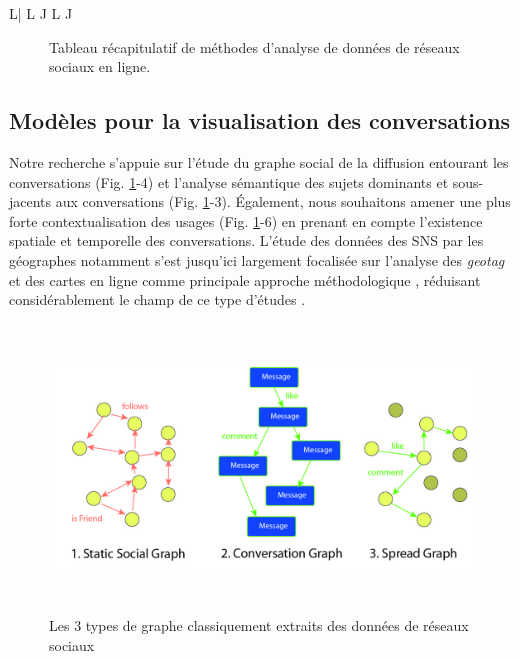 \begin{landscape}
{\begin{spacing}{1}
\begin{ltabulary}{L| L J L J}
    \end{ltabulary}
    \end{spacing} %
    \begin{figure}
        \caption[Tableau récapitulatif de méthodes d{\textquoteright}analyse de données de réseaux sociaux en ligne.]{Tableau récapitulatif de méthodes d{\textquoteright}analyse de données de réseaux sociaux en ligne.}
        \label{tab:sna}
    \end{figure}
}
\end{landscape}

\subsection[Modèles pour la visualisation des conversations]{Modèles pour la visualisation des conversations}

Notre recherche s'appuie sur l{\textquoteright}étude du graphe social de la diffusion entourant les conversations (Fig. \ref{tab:sna}-4) et l{\textquoteright}analyse sémantique des sujets dominants et sous-jacents aux conversations (Fig. \ref{tab:sna}-3). \'Egalement, nous souhaitons amener une plus forte contextualisation des usages (Fig. \ref{tab:sna}-6) en prenant en compte l{\textquoteright}existence spatiale et temporelle des conversations. L'étude des données des SNS par les géographes notamment s{\textquoteright}est jusqu{\textquoteright}ici largement focalisée sur l{\textquoteright}analyse des \textit{geotag} et des cartes en ligne comme principale approche méthodologique \citep{Graham2011, Poorthuis2013}, réduisant considérablement le champ de ce type d'études \citep{Crampton2013}.

\begin{figure}[htbp]
    \centering
    \includegraphics[width=6.2894in,height=3.0004in]{figures/chap3/chapitre3-img9.jpg}
    \caption[3 modèles de réseau]{Les 3 types de graphe classiquement extraits des données de réseaux sociaux}
\end{figure}


